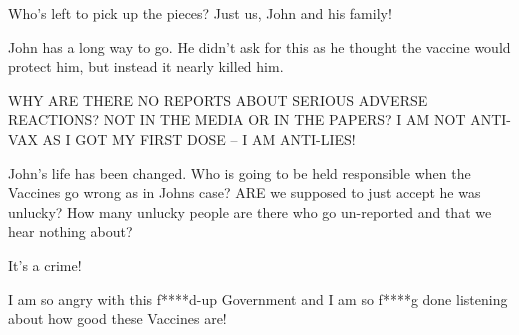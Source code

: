 {Who’s left to pick up the pieces? Just us, John and his family!

John has a long way to go. He didn’t ask for this as he thought the vaccine
would protect him, but instead it nearly killed him.

WHY ARE THERE NO REPORTS ABOUT SERIOUS ADVERSE REACTIONS? NOT IN THE MEDIA OR IN
THE PAPERS? I AM NOT ANTI-VAX AS I GOT MY FIRST DOSE – I AM ANTI-LIES!

John’s life has been changed. Who is going to be held responsible when the
Vaccines go wrong as in Johns case?  ARE we supposed to just accept he was
unlucky? How many unlucky people are there who go un-reported and that we hear
nothing about?

It’s a crime!

I am so angry with this f****d-up Government and I am so f****g done listening
about how good these Vaccines are!

}
